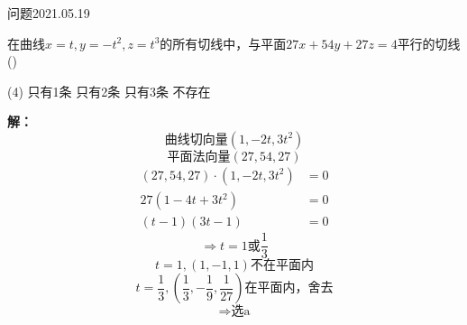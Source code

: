 \begin{mybox}{问题2021.05.19}
	
	\qquad 在曲线$x=t,y=-t^2,z=t^3$的所有切线中，与平面$27x+54y+27z=4$平行的切线()
	\begin{tasks}(4)
		\task 只有1条
		\task 只有2条
		\task 只有3条
		\task 不存在
	\end{tasks}
\end{mybox}
\noindent
\textbf{解：}
$$\text{曲线切向量}(1,-2t,3t^2)$$
$$\text{平面法向量}(27,54,27)$$
\begin{align*}
	(27,54,27)\cdot (1,-2t,3t^2) &=0\\
	27(1-4t+3t^2)&=0\\
	(t-1)(3t-1)&=0
\end{align*}
$$\Rightarrow t=1\text{或}\frac{1}{3}$$
$$t=1,(1,-1,1)\text{不在平面内}$$
$$t=\frac{1}{3},(\frac{1}{3},-\frac{1}{9},\frac{1}{27})\text{在平面内，舍去}$$
$$\Rightarrow \text{选a}$$